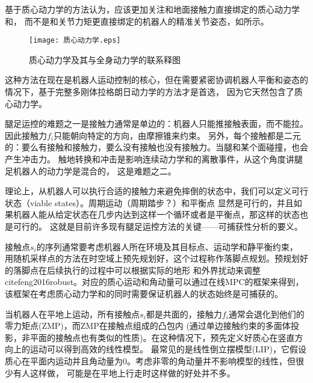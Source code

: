 基于质心动力学的方法认为，应该更加关注和地面接触力直接绑定的质心动力学
和，
而不是和关节力矩更直接绑定的机器人的精准关节姿态\cite{vukobratovic1972contribution}，如所示。
\begin{figure}[htbp]
    \centering
    \texttt{[image: 质心动力学.eps]}
    \caption{\label{fig:centroid}质心动力学及其与全身动力学的联系释图}
\end{figure}
这种方法在现在是机器人运动控制的核心，但在需要紧密协调机器人平衡和姿态的情况下，基于完整多刚体拉格朗日动力学的方法才是首选，
因为它天然包含了质心动力学\cite{orin2013centroidal}。

腿足运控的难题之一是接触力通常是单边的：机器人只能推接触表面，而不能拉。因此接触力$f_i$只能朝向特定的方向，由摩擦锥来约束。
另外，每个接触都是二元的：要么有接触和接触力，要么没有接触也没有接触力。当腿和某个面碰撞，也会产生冲击力。
触地转换和冲击是影响连续动力学和的离散事件，从这个角度讲腿足机器人的动力学是混合的，
这是难题之二。

理论上，从机器人可以执行合适的接触力来避免摔倒的状态中，我们可以定义可行状态（viable states）。周期运动（周期踏步？）和平衡点
显然是可行的，并且如果机器人能从给定状态在几步内达到这样一个循环或者是平衡点，那这样的状态也是可行的\cite{wieber2002stability}。
这就是目前许多现有腿足运控方法的关键\cite{wieber2016modeling}——可捕获性分析\cite{pratt2006velocity}的要义。

接触点$s_i$的序列通常要考虑机器人所在环境及其目标点、运动学和静平衡约束\cite{escande2013planning}，
用随机采样点的方法在时空域上预先规划好，这个过程称作落脚点规划。预规划好的落脚点在后续执行的过程中可以根据实际的地形
和外界扰动来调整cite{feng2016robust}。对应的质心运动和角动量可以通过在线MPC的框架来得到\cite{wieber2006trajectory}，
该框架在考虑质心动力学和的同时需要保证机器人的状态始终是可捕获的\cite{wieber2016modeling}。

当机器人在平地上运动，所有接触点$s_i$都是共面的，接触力$f_i$通常会退化到他们的零力矩点(ZMP)，而ZMP在接触点组成的凸包内\cite{wieber2002stability}
(通过单边接触约束的多面体投影，非平面的接触点也有类似的性质\cite{caron2016zmp})。在这种情况下，预先定义好质心在竖直方向上的运动可以得到高效的线性模型。
最常见的是线性倒立摆模型(LIP)，它假设质心在平面内运动并且角动量为0\cite{kajita1991study}。考虑非零的角动量并不影响模型的线性，但很少有人这样做，
可能是在平地上行走时这样做的好处并不多\cite{koolen2012capturability}。

